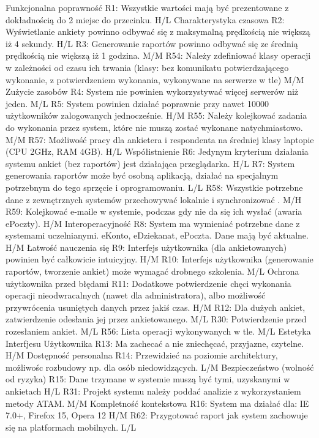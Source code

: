 Funkcjonalna poprawność
R1: Wszystkie wartości mają być prezentowane z dokładnością do 2 miejsc do przecinku. H/L
Charakterystyka czasowa
R2: Wyświetlanie ankiety powinno odbywać się z maksymalną prędkością nie większą iż 4 sekundy. H/L
R3: Generowanie raportów powinno odbywać się ze średnią prędkością nie większą iż 1 godzina. M/M
R54: Należy zdefiniować klasy operacji w zależności od czasu ich trwania (klasy: bez komunikatu potwierdzającego wykonanie, z potwierdzeniem wykonania, wykonywane na serwerze w tle) M/M
Zużycie zasobów
R4: System nie powinien wykorzystywać więcej serwerów niż jeden. M/L
R5: System powinien działać poprawnie przy nawet 10000 użytkowników zalogowanych jednocześnie. H/M
R55: Należy kolejkować zadania do wykonania przez system, które nie muszą zostać wykonane natychmiastowo. M/M
R57: Możliwość pracy dla ankietera i respondenta na średniej klasy laptopie (CPU 2GHz, RAM 4GB). H/L
Współistnienie
R6: Jedynym kryterium działania systemu ankiet (bez raportów) jest działająca przeglądarka. H/L
R7: System generowania raportów może być osobną aplikacją, działać na specjalnym potrzebnym do tego sprzęcie i oprogramowaniu. L/L
R58: Wszystkie potrzebne dane z zewnętrznych systemów przechowywać lokalnie i synchronizować . M/H
R59: Kolejkować e-maile w systemie, podczas gdy nie da się ich wysłać (awaria ePoczty). H/M
Interoperacyjność
R8: System ma wymieniać potrzebne dane z systemami uczelnianymi. eKonto, eDziekanat, ePoczta. Dane mają być aktualne. H/M
Łatwość nauczenia się
R9: Interfejs użytkownika (dla ankietowanych) powinien być całkowicie intuicyjny. H/M
R10: Interfejs użytkownika (generowanie raportów, tworzenie ankiet) może wymagać drobnego szkolenia. M/L
Ochrona użytkownika przed błędami
R11: Dodatkowe potwierdzenie chęci wykonania operacji nieodwracalnych (nawet dla administratora), albo możliwość przywrócenia usuniętych danych przez jakiś czas. H/M
R12: Dla dużych ankiet, zatwierdzenie odesłania jej przez ankietowanego. M/L
R30: Potwierdzenie przed rozesłaniem ankiet. M/L
R56: Lista operacji wykonywanych w tle. M/L
Estetyka Interfjesu Użytkownika
R13: Ma zachecać a nie zniechęcać, przyjazne, czytelne. H/M
Dostępność personalna
R14: Przewidzieć na poziomie architektury, możliwośc rozbudowy np. dla osób niedowidzących. L/M
Bezpieczeństwo (wolność od ryzyka)
R15: Dane trzymane w systemie muszą być tymi, uzyskanymi w ankietach H/L
R31: Projekt systemu należy poddać analizie z wykorzystaniem metody ATAM. M/M
Kompletność kontekstowa
R16: System ma działać dla: IE 7.0+, Firefox 15, Opera 12 H/M
R62: Przygotować raport jak system zachowuje się na platformach mobilnych. L/L
